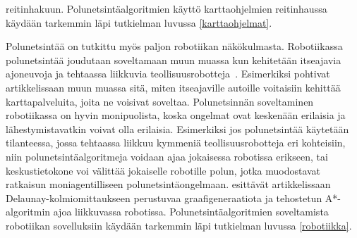 reitinhakuun. Polunetsintäalgoritmien käyttö karttaohjelmien reitinhaussa 
käydään tarkemmin läpi tutkielman luvussa \ref{karttaohjelmat}.\par
	Polunetsintää on tutkittu myös paljon robotiikan näkökulmasta. 
Robotiikassa polunetsintää joudutaan soveltamaan muun muassa kun 
kehitetään itseajavia ajoneuvoja ja tehtaassa liikkuvia 
teollisuusrobotteja~\cite{arXivMAPF}. Esimerkiksi \textcite{Lanelet2} 
pohtivat artikkelissaan muun muassa sitä, miten itseajaville autoille 
voitaisiin kehittää karttapalveluita, joita ne voisivat soveltaa. 
Polunetsinnän soveltaminen robotiikassa on hyvin monipuolista, koska 
ongelmat ovat keskenään erilaisia ja lähestymistavatkin voivat olla 
erilaisia. Esimerkiksi jos polunetsintää käytetään tilanteessa, jossa 
tehtaassa liikkuu kymmeniä teollisuusrobotteja eri koh\-teisiin, niin 
polunetsintäalgoritmeja voidaan ajaa jokaisessa robotissa erikseen, tai 
keskustietokone voi välittää jokaiselle robotille polun, jotka muodostavat 
ratkaisun moniagentilliseen polunetsintäongelmaan. 
\textcite{DelaunayVoronoiAStar} esittävät artikkelissaan 
Delaunay-kolmiomittaukseen perustuvaa graafigeneraatiota ja tehostetun 
A*-algoritmin ajoa liikkuvassa robotissa. Polunetsintäalgoritmien 
soveltamista robotii\-kan sovelluksiin käydään tarkemmin läpi tutkielman 
luvussa \ref{robotiikka}.

